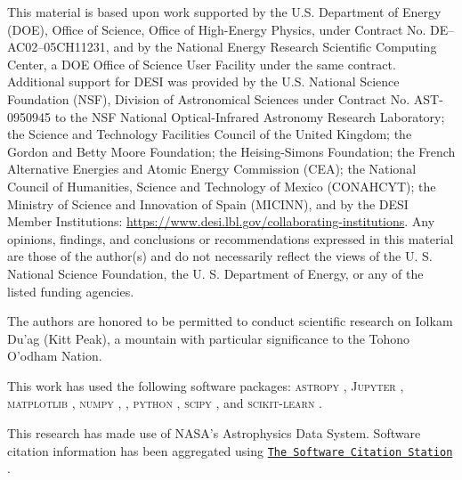 This material is based upon work supported by the U.S. Department of Energy (DOE), Office of Science, Office of High-Energy Physics, under Contract No. DE–AC02–05CH11231, and by the National Energy Research Scientific Computing Center, a DOE Office of Science User Facility under the same contract. Additional support for DESI was provided by the U.S. National Science Foundation (NSF), Division of Astronomical Sciences under Contract No. AST-0950945 to the NSF National Optical-Infrared Astronomy Research Laboratory; the Science and Technology Facilities Council of the United Kingdom; the Gordon and Betty Moore Foundation; the Heising-Simons Foundation; the French Alternative Energies and Atomic Energy Commission (CEA); the National Council of Humanities, Science and Technology of Mexico (CONAHCYT); the Ministry of Science and Innovation of Spain (MICINN), and by the DESI Member Institutions: \url{https://www.desi.lbl.gov/collaborating-institutions}. Any opinions, findings, and conclusions or recommendations expressed in this material are those of the author(s) and do not necessarily reflect the views of the U. S. National Science Foundation, the U. S. Department of Energy, or any of the listed funding agencies.

The authors are honored to be permitted to conduct scientific research on Iolkam Du’ag (Kitt Peak), a mountain with particular significance to the Tohono O’odham Nation.

This work has used the following software packages: \textsc{astropy} \citep{astropy:2013, astropy:2018, astropy:2022}, \textsc{Jupyter} \citep{2007CSE.....9c..21P, kluyver2016jupyter}, \textsc{matplotlib} \citep{Hunter:2007}, \textsc{numpy} \citep{numpy}, \pycorr{} \citep{pycorr,corrfunc-1,corrfunc-2}, \textsc{python} \citep{python}, \textsc{scipy} \citep{2020SciPy-NMeth, scipy_8092679}, and \textsc{scikit-learn} \citep{scikit-learn, sklearn_api, scikit-learn_10034229}.

This research has made use of NASA's Astrophysics Data System.
Software citation information has been aggregated using \texttt{\href{https://www.tomwagg.com/software-citation-station/}{The Software Citation Station}} \citep{software-citation-station-paper, software-citation-station-zenodo}.
